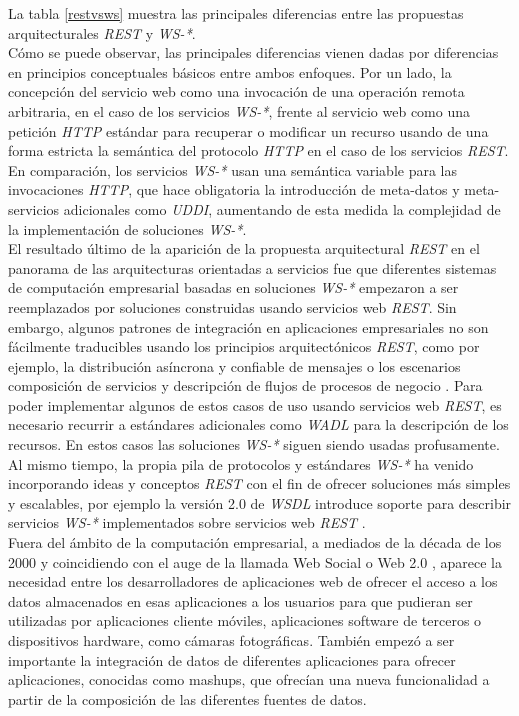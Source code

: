 La tabla \ref{restvsws} muestra las principales diferencias entre las propuestas arquitecturales \textit{REST} y \textit{WS-*}.\\
C\'omo se puede observar, las principales diferencias vienen dadas por diferencias en principios conceptuales b\'asicos entre ambos enfoques. Por un lado, la concepci\'on del servicio web como una invocaci\'on de una operaci\'on remota arbitraria, en el caso de los servicios \textit{WS-*}, frente al servicio web como una petici\'on \textit{HTTP} est\'andar para recuperar o modificar un recurso usando de una forma estricta la sem\'antica del protocolo \textit{HTTP} en el caso de los servicios \textit{REST}. En comparaci\'on, los servicios \textit{WS-*} usan una sem\'antica variable para las invocaciones \textit{HTTP}, que hace obligatoria la introducci\'on de meta-datos y meta-servicios adicionales como \textit{UDDI}, aumentando de esta medida la complejidad de la implementaci\'on de soluciones \textit{WS-*}.\\
El resultado \'ultimo de la aparici\'on de la propuesta arquitectural \textit{REST} en el panorama de las arquitecturas orientadas a servicios fue que diferentes sistemas de computaci\'on empresarial basadas en soluciones \textit{WS-*} empezaron a ser reemplazados por soluciones construidas usando servicios web \textit{REST}. Sin embargo, algunos patrones de integraci\'on en aplicaciones empresariales no son f\'acilmente traducibles usando los principios arquitect\'onicos \textit{REST}, como por ejemplo, la distribuci\'on as\'incrona y confiable de mensajes o los escenarios composici\'on de servicios y descripci\'on de flujos de procesos de negocio \cite{pautasso2008restful}. Para poder implementar algunos de estos casos de uso usando servicios web \textit{REST}, es necesario recurrir a est\'andares adicionales como \textit{WADL} \cite{wadl} para la descripci\'on de los recursos. En estos casos las soluciones \textit{WS-*} siguen siendo usadas profusamente.\\
Al mismo tiempo, la propia pila de protocolos y est\'andares \textit{WS-*} ha venido incorporando ideas y conceptos \textit{REST} con el fin de ofrecer soluciones m\'as simples y escalables, por ejemplo la versi\'on 2.0 de \textit{WSDL} introduce soporte para describir servicios \textit{WS-*} implementados sobre servicios web \textit{REST} \cite{takase2008definition}.\\
Fuera del \'ambito de la computaci\'on empresarial, a mediados de la d\'ecada de los 2000 y coincidiendo con el auge de la llamada Web Social o Web 2.0 \cite{murugesan2007understanding}, aparece la necesidad entre los desarrolladores de aplicaciones web de ofrecer el acceso a los datos almacenados en esas aplicaciones a los usuarios para que pudieran ser utilizadas por aplicaciones cliente m\'oviles, aplicaciones software de terceros o dispositivos hardware, como c\'amaras fotogr\'aficas. Tambi\'en empez\'o a ser importante la integraci\'on de datos de diferentes aplicaciones para ofrecer aplicaciones, conocidas como mashups, que ofrec\'ian una nueva funcionalidad a partir de la composici\'on de las diferentes fuentes de datos.\\
